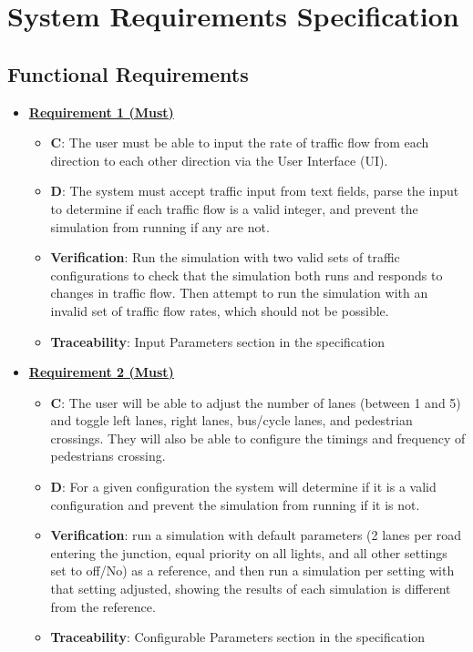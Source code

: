 \documentclass{article}
\begin{document}
\section{System Requirements Specification}
\subsection{Functional Requirements}
\begin{itemize}

    \item \textbf{\underline{Requirement 1 (Must)}}
    \begin{itemize}
        \item \textbf{C}: The user must be able to input the rate of traffic flow from 
            each direction to each other direction via the User Interface (UI).
        \item \textbf{D}: The system must accept traffic input from text fields, parse the input to 
            determine if each traffic flow is a valid integer, and prevent the simulation from 
            running if any are not.
        \item \textbf{Verification}: Run the simulation with two valid sets of traffic configurations 
            to check that the simulation both runs and responds to changes in traffic flow. Then attempt to run 
            the simulation with an invalid set of traffic flow rates, which should not be possible.
        \item\textbf{Traceability}: Input Parameters section in the specification
    \end{itemize}
    
    \item \textbf{\underline{Requirement 2 (Must)}}
    \begin{itemize}
        \item \textbf{C}: The user will be able to adjust the number of lanes (between 1 and 5) 
            and toggle left lanes, right lanes, bus/cycle lanes, and pedestrian crossings. They will 
            also be able to configure the timings and frequency of pedestrians crossing.
        \item \textbf{D}: For a given configuration the system will determine if it is a valid 
            configuration and prevent the simulation from running if it is not.
        \item \textbf{Verification}: run a simulation with default parameters (2 lanes per 
            road entering the junction, equal priority on all lights, and all other 
            settings set to off/No) as a reference, and then run a simulation per setting 
            with that setting adjusted, showing the results of each simulation is different 
            from the reference.
        \item\textbf{Traceability}: Configurable Parameters section in the specification
    \end{itemize}


\end{itemize}
\end{document}
